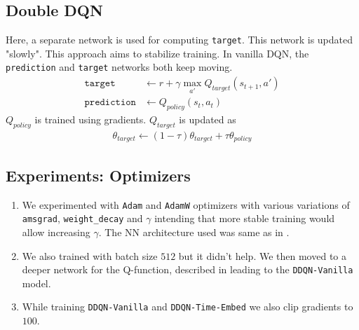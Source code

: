\subsection{Double DQN}
Here, a separate network is used for computing \texttt{target}. This network is updated "slowly". This approach aims to stabilize training. In vanilla DQN, the \texttt{prediction} and \texttt{target} networks both keep moving. 
\begin{align*}
    \texttt{target} &\gets r + \gamma \max_{a'} Q_{target}(s_{t + 1}, a')\\
    \texttt{prediction} &\gets Q_{policy}(s_t, a_t)
\end{align*}
$Q_{policy}$ is trained using gradients. $Q_{target}$ is updated as
\begin{align*}
    \theta_{target} \gets (1 - \tau)  \theta_{target} + \tau \theta_{policy}
\end{align*}
\subsection{Experiments: Optimizers}
\begin{enumerate}
    \item We experimented with \texttt{Adam} and \texttt{AdamW} optimizers with various variations of \texttt{amsgrad}, \texttt{weight\_decay} and $\gamma$ intending that more stable training would allow increasing $\gamma$. The NN architecture used was same as in .
    \item We also trained with batch size $512$ but it didn't help. We then moved to a deeper network for the Q-function, described in  leading to the \texttt{DDQN-Vanilla} model.

    \item While training \texttt{DDQN-Vanilla} and \texttt{DDQN-Time-Embed} we also clip gradients to $100$.


\end{enumerate}
